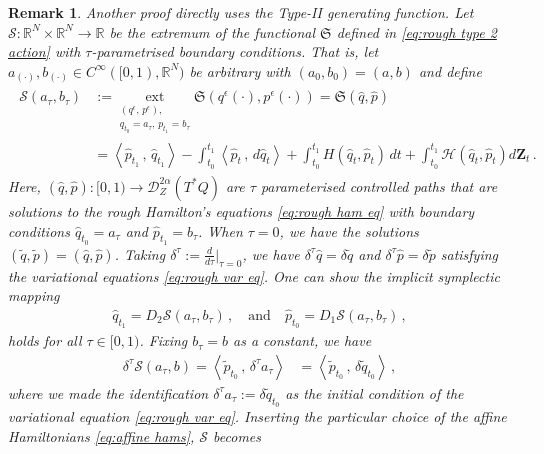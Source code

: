 \documentclass[11pt, oneside]{article}
\numberwithin{equation}{section}
\newtheorem{remark}{Remark}[section]
\theoremstyle{definition}
\newcommand{\wt}[1]{\widetilde{#1}}
\newcommand{\wh}[1]{\widehat{#1}}
\newcommand{\mc}[1]{\mathcal{#1}}
\newcommand{\mcal}[1]{\mc{#1}}
\newcommand{\scp}[2]{{\left\langle {#1}\, , \, {#2}\right\rangle}}
\begin{document}
\begin{remark}
    Another proof directly uses the Type-II generating function. Let $\mcal{S} : \mathbb{R}^N\times \mathbb{R}^N \rightarrow \mathbb{R}$ be the extremum of the functional $\mathfrak{S}$ defined in \eqref{eq:rough type 2 action} with $\tau$-parametrised boundary conditions. That is, let $a_{(\cdot)}, b_{(\cdot)} \in C^\infty([0,1),\mathbb{R}^N)$ be arbitrary with $(a_0, b_0) = (a, b)$ and define
    \begin{align}
        \begin{split}
            \mathcal{S}(a_\tau, b_\tau) &:= \underset{\substack{(q^\epsilon,\, p^\epsilon), \\q_{t_0} = a_\tau,\, p_{t_1}=b_\tau }}{\text{ext}}\mathfrak{S}(q^\epsilon(\cdot), p^\epsilon(\cdot)) = \mathfrak{S}(\wh{q}, \wh{p})\\
    &= \scp{\wh{p}_{t_1}}{\wh{q}_{t_1}} - \int_{t_0}^{t_1}\scp{\wh{p}_t}{d \wh{q}_t} + \int_{t_0}^{t_1}H(\wh{q}_t, \wh{p}_t)\,dt + \int_{t_0}^{t_1}\mcal{H}(\wh{q}_t, \wh{p}_t) d\mathbf{Z}_t \,.
        \end{split}
    \end{align}
    Here, $(\wh{q}, \wh{p}) : [0,1) \rightarrow \mcal{D}^{2\alpha}_Z(T^*Q)$ are $\tau$ parameterised controlled paths that are solutions to the rough Hamilton's equations \eqref{eq:rough ham eq} with boundary conditions $\wh{q}_{t_0} = a_\tau$ and $\wh{p}_{t_1} = b_\tau$. When $\tau =0$, we have the solutions $(\wt{q}, \wt{p}) = (\wh{q}, \wh{p})$. Taking $\delta^\tau := \frac{d}{d\tau}\big|_{\tau = 0}$, we have $\delta^\tau\wh{q} = \delta \wt{q}$ and $\delta^\tau \wh{p} = \delta\wt{p}$ satisfying the variational equations \eqref{eq:rough var eq}. One can show the implicit symplectic mapping 
    \begin{align*}
        \wh{q}_{t_1} = D_2 \mcal{S}(a_\tau, b_\tau)\,,\quad \text{and}\quad \wh{p}_{t_0} = D_1 \mcal{S}(a_\tau, b_\tau)\,,
    \end{align*}
    holds for all $\tau \in [0,1)$. Fixing $b_\tau = b$ as a constant, we have 
    \begin{align*}
        \delta^\tau \mcal{S}(a_\tau, b) = \scp{\wt{p}_{t_0}}{\delta^\tau a_\tau} &= \scp{\wt{p}_{t_0}}{\delta \wt{q}_{t_0}}\,,
    \end{align*}
    where we made the identification $\delta^\tau a_\tau := \delta \wt{q}_{t_0}$ as the initial condition of the variational equation \eqref{eq:rough var eq}. Inserting the particular choice of the affine Hamiltonians \eqref{eq:affine hams}, $\mcal{S}$ becomes 

\end{remark}
\end{document}
